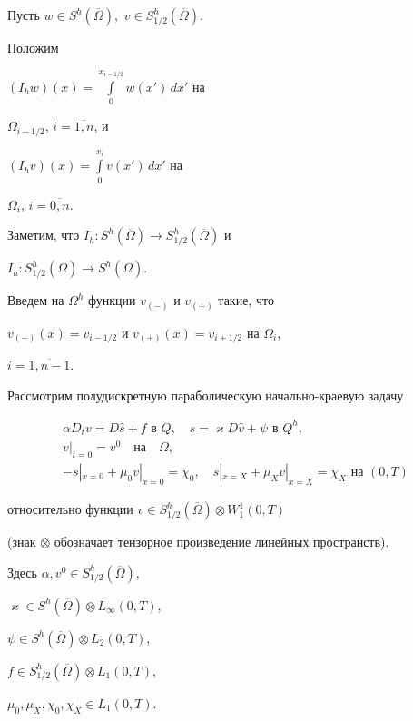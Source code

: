 \documentclass[12pt]{article}
\theoremstyle{plain} %
\theoremstyle{definition}
\numberwithin{equation}{section}
\begin{document}
Пусть $w\in S^h(\overline\Omega),$ $v\in S^h_{1/2}(\overline\Omega)$.


Положим


$(I_hw)(x)=\int\limits_0^{x_{i-1/2}}w(x')\,dx'$ на


$\Omega_{i-1/2}$, $i=\overline{1,n}$, и


$(I_hv)(x)=\int\limits_0^{x_i}v(x')\,dx'$ на


$\Omega_i$, $i=\overline{0,n}$.


Заметим, что $I_h: S^h(\overline\Omega)\to S^h_{1/2}(\overline\Omega)$ и


$I_h: S^h_{1/2}(\overline\Omega)\to S^h(\overline\Omega)$.


Введем на $\Omega^h$ функции $v_{(-)}$ и $v_{(+)}$ такие, что


$v_{(-)}(x)=v_{i-1/2}$ и $v_{(+)}(x)=v_{i+1/2}$ на $\Omega_i$,


$i=\overline{1,n-1}$.





Рассмотрим полудискретную параболическую начально-краевую задачу


\begin{gather}


\alpha D_tv=D\widehat s + f\text{ в } Q,


\quad s=\varkappa D\widehat v +\psi\text{ в } Q^h,\\


%


v|_{t=0}=v^0\quad\text{на}\quad\Omega,\\


%


-s|_{x=0}+\mu_0 v|_{x=0}=\chi_0,\quad


s|_{x=X}+\mu_X v|_{x=X}=\chi_X\text{ на } (0,T)


\end{gather}


относительно функции $v\in S^h_{1/2}(\overline\Omega)\otimes W_1^1(0,T)$


(знак $\otimes$ обозначает тензорное произведение линейных пространств).


Здесь $\alpha,v^0\in S^h_{1/2}(\overline\Omega)$,


$\varkappa\in S^h(\overline\Omega)\otimes L_\infty (0,T)$,


$\psi\in S^h(\overline\Omega)\otimes L_2(0,T)$,


$f\in S^h_{1/2}(\overline\Omega)\otimes L_1(0,T)$,


$\mu_0,\mu_X,\chi_0,\chi_X\in L_1(0,T)$.
\end{document}
